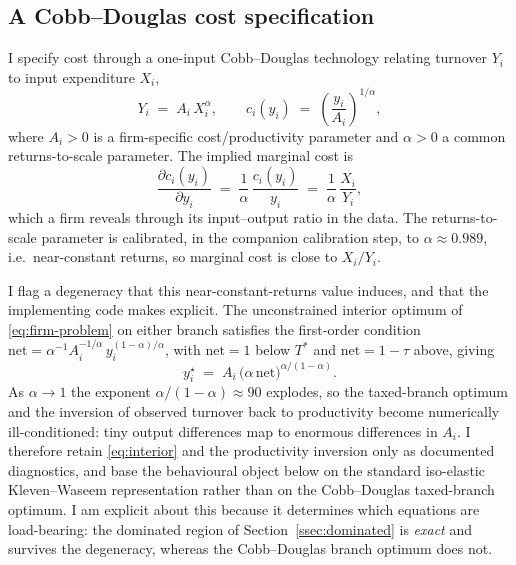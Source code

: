 
\subsection{A Cobb--Douglas cost specification}
\label{ssec:cost}

I specify cost through a one-input Cobb--Douglas technology relating turnover
$Y_i$ to input expenditure $X_i$,
\begin{equation}
  Y_i \;=\; A_i\, X_i^{\alpha},
  \qquad
  c_i(y_i) \;=\; \left(\frac{y_i}{A_i}\right)^{1/\alpha},
  \label{eq:production}
\end{equation}
where $A_i>0$ is a firm-specific cost/productivity parameter and $\alpha>0$ a
common returns-to-scale parameter. The implied marginal cost is
\begin{equation}
  \frac{\partial c_i(y_i)}{\partial y_i}
  \;=\; \frac{1}{\alpha}\,\frac{c_i(y_i)}{y_i}
  \;=\; \frac{1}{\alpha}\,\frac{X_i}{Y_i},
  \label{eq:mc}
\end{equation}
which a firm reveals through its input--output ratio in the data. The
returns-to-scale parameter is calibrated, in the companion calibration step, to
$\alpha \approx 0.989$, i.e.\ near-constant returns, so marginal cost is close to
$X_i/Y_i$.

I flag a degeneracy that this near-constant-returns value induces, and that the
implementing code makes explicit. The unconstrained interior optimum of
\eqref{eq:firm-problem} on either branch satisfies the first-order condition
$\mathrm{net} = \alpha^{-1} A_i^{-1/\alpha}\,y_i^{(1-\alpha)/\alpha}$, with
$\mathrm{net}=1$ below $T^{*}$ and $\mathrm{net}=1-\tau$ above, giving
\begin{equation}
  y_i^{\star} \;=\; A_i\,\bigl(\alpha\,\mathrm{net}\bigr)^{\alpha/(1-\alpha)}.
  \label{eq:interior}
\end{equation}
As $\alpha\to1$ the exponent $\alpha/(1-\alpha)\approx 90$ explodes, so the
taxed-branch optimum and the inversion of observed turnover back to productivity
become numerically ill-conditioned: tiny output differences map to enormous
differences in $A_i$. I therefore retain \eqref{eq:interior} and the
productivity inversion only as documented diagnostics, and base the behavioural
object below on the standard iso-elastic Kleven--Waseem representation rather
than on the Cobb--Douglas taxed-branch optimum. I am explicit about this because
it determines which equations are load-bearing: the dominated region of
Section~\ref{ssec:dominated} is \emph{exact} and survives the degeneracy, whereas
the Cobb--Douglas branch optimum does not.

